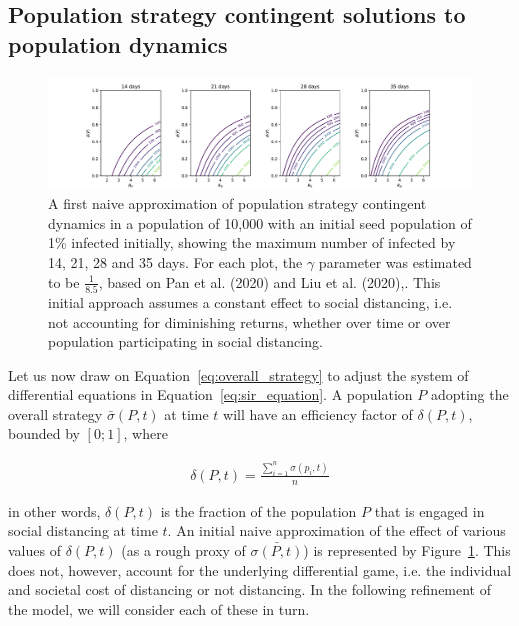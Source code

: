 \documentclass{article}
\begin{document}

\subsection{Population strategy contingent solutions to population dynamics} %
\label{sub:population_strategy_contingent_solutions_to_population_dynamics}


\begin{figure}
	\includegraphics[width=\linewidth]{figures/fig2-strategy_solutions_by_days}
	\caption{A first naive approximation of population strategy contingent dynamics in a population of 10,000 with an initial seed population of 1\% infected initially, showing the maximum number of infected by 14, 21, 28 and 35 days. For each plot, the $\gamma$ parameter was estimated to be $\frac{1}{8.5}$, based on Pan et al. (2020) and Liu et al. (2020),\cite{pan2020clinical,liu2020risk}. This initial approach assumes a constant effect to social distancing, i.e. not accounting for diminishing returns, whether over time or over population participating in social distancing.}
	\label{fig:first_naive_solution}
\end{figure}

Let us now draw on Equation~\eqref{eq:overall_strategy} to adjust the system of differential equations in Equation~\eqref{eq:sir_equation}. A population $P$ adopting the overall strategy $\bar{\sigma}(P, t)$ at time $t$ will have an efficiency factor of $\delta(P, t)$, bounded by $[0; 1]$, where

\begin{equation}
	\begin{aligned}
		\delta(P, t) = \frac{\displaystyle \sum_{i = 1}^n \sigma(p_i, t)}{n}
	\end{aligned}
	\label{eq:delta_p_t}
\end{equation} 

\noindent in other words, $\delta(P, t)$ is the fraction of the population $P$ that is engaged in social distancing at time $t$. An initial naive approximation of the effect of various values of $\delta(P, t)$ (as a rough proxy of $\bar{\sigma{(P, t)}}$) is represented by Figure~\ref{fig:first_naive_solution}. This does not, however, account for the underlying differential game, i.e. the individual and societal cost of distancing or not distancing. In the following refinement of the model, we will consider each of these in turn.
\end{document}
